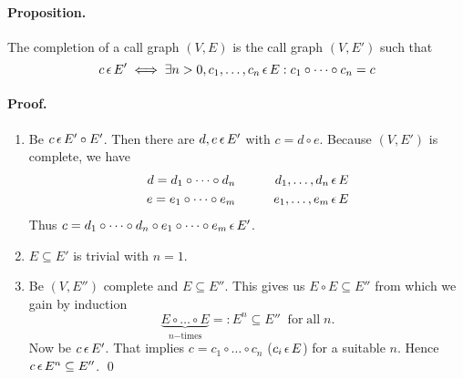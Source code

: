 \paragraph*{Proposition.}
The completion of a call graph $(V,E)$ is the call graph $(V,E')$
such that
$$
    c \,\epsilon\, E' \iff \exists n>0, c_1, \dots, c_n \,\epsilon\, E : c_1 \circ \dots \circ
    c_n = c
$$
\paragraph*{Proof.}
\begin{enumerate}
\item
Be $c \,\epsilon\, E' \circ E'$. Then there are $d,e \,\epsilon\, E'$ with $c = d \circ
e$. Because $(V,E')$ is complete, we have
\begin{eqnarray*}
    d = d_1 \circ \dots \circ d_n & \qquad & d_1,\dots,d_n \,\epsilon\, E \\
    e = e_1 \circ \dots \circ e_m & \qquad & e_1,\dots,e_m \,\epsilon\, E
\end{eqnarray*}
Thus $c = d_1 \circ \dots \circ d_n \circ e_1 \circ \dots \circ e_m
\,\epsilon\, E'$.
\item $E \subseteq E'$ is trivial with $n=1$.
\item Be $(V,E'')$ complete and $E \subseteq E''$. This gives us $E \circ
  E \subseteq E''$ from which we gain by induction
$$
    \underbrace{E \circ \dots \circ E}_{n\mathrm{-times}} =:
    E^n \subseteq E'' \;\;\mathrm{for}\;\mathrm{all}\;n.
$$
Now be $c \,\epsilon\, E'$. That implies $c = c_1 \circ \dots \circ c_n$ ($c_i
\,\epsilon\, E$) for a suitable $n$. Hence $c \,\epsilon\, E^n \subseteq E''$.
\qed
\end{enumerate}


